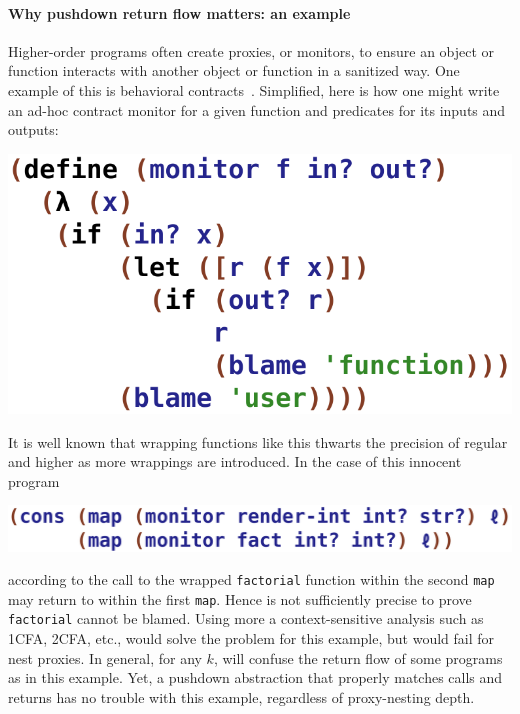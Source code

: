 \paragraph{Why pushdown return flow matters: an example}
Higher-order programs often create proxies, or monitors, to ensure an object or function interacts with another object or function in a sanitized way.
%
One example of this is behavioral contracts~\citep{dvanhorn:Findler2002Contracts}.
%
Simplified, here is how one might write an ad-hoc contract monitor for
a given function and predicates for its inputs and outputs:
 \begin{center}
  \includegraphics[scale=0.45]{monitor}
 \end{center}

It is well known that wrapping functions like this thwarts the
precision of regular \zcfa{} and higher \kcfa{} as more wrappings are
introduced.
%
In the case of this innocent program
 \begin{center}
  \includegraphics[scale=0.45]{pair}
 \end{center}

according to \zcfa{} the call to the wrapped \texttt{factorial}
function within the second \texttt{map} may return to within the
first \texttt{map}.  Hence \zcfa{} is not sufficiently precise to 
prove \texttt{factorial} cannot be blamed.
%
Using more a context-sensitive analysis such as 1CFA, 2CFA, etc.,
would solve the problem for this example, but would fail for nest
proxies.
%
In general, for any $k$, \kcfa{} will confuse the return flow of some
programs as in this example.
%
Yet, a pushdown abstraction that properly matches calls and returns
has no trouble with this example, regardless of proxy-nesting depth.


